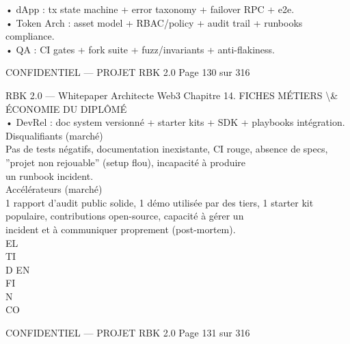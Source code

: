 \documentclass[12pt,landscape,a4paper]{article}
\newenvironment{confidential}
{\begin{tcolorbox}[
    colback=rbkred!5!white,
    colframe=rbkred!75!black,
    title=CONFIDENTIEL,
    fonttitle=\bfseries\color{white},
    coltitle=rbkred!75!black,
    breakable,
    enhanced,
    frame hidden,
    borderline west={2pt}{0pt}{rbkred!75!black}
]}
{\end{tcolorbox}}
\begin{document}
\vspace{0.5em}
• dApp : tx state machine + error taxonomy + failover RPC + e2e.\\
\vspace{0.5em}
• Token Arch : asset model + RBAC/policy + audit trail + runbooks compliance.\\
\vspace{0.5em}
• QA : CI gates + fork suite + fuzz/invariants + anti-flakiness.\\
\vspace{0.5em}
\vspace{0.5em}
\begin{confidential}CONFIDENTIEL — PROJET RBK 2.0                                  Page 130 sur 316\end{confidential}
RBK 2.0 — Whitepaper Architecte Web3                                                Chapitre 14. FICHES MÉTIERS \textbackslash{}& ÉCONOMIE DU DIPLÔMÉ\\
\vspace{0.5em}
\vspace{0.5em}
• DevRel : doc system versionné + starter kits + SDK + playbooks intégration.\\
\vspace{0.5em}
Disqualifiants (marché)\\
\vspace{0.5em}
Pas de tests négatifs, documentation inexistante, CI rouge, absence de specs, ”projet non rejouable” (setup flou), incapacité à produire\\
un runbook incident.\\
\vspace{0.5em}
Accélérateurs (marché)\\
1 rapport d’audit public solide, 1 démo utilisée par des tiers, 1 starter kit populaire, contributions open-source, capacité à gérer un\\
incident et à communiquer proprement (post-mortem).\\
\vspace{0.5em}
\vspace{0.5em}
\vspace{0.5em}
\vspace{0.5em}
EL\\
TI\\
D    EN\\
FI\\
N\\
CO\\
\vspace{0.5em}
\vspace{0.5em}
\vspace{0.5em}
\vspace{0.5em}
\begin{confidential}CONFIDENTIEL — PROJET RBK 2.0                                 Page 131 sur 316\end{confidential}
\end{document}
